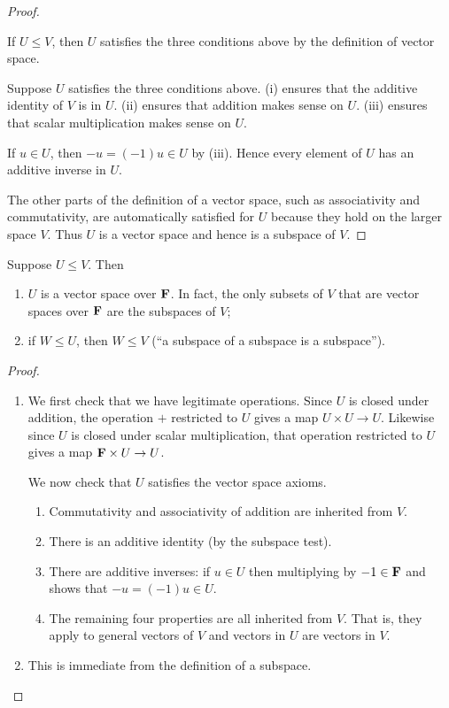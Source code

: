 \begin{proof} \

\fbox{$\implies$} If $U\le V$, then $U$ satisfies the three conditions above by the definition of vector space.

\fbox{$\impliedby$} Suppose $U$ satisfies the three conditions above. (i) ensures that the additive identity of $V$ is in $U$. (ii) ensures that addition makes sense on $U$. (iii) ensures that scalar multiplication makes sense on $U$.

If $u\in U$, then $-u=(-1)u\in U$ by (iii). Hence every element of $U$ has an additive inverse in $U$.

The other parts of the definition of a vector space, such as associativity and commutativity, are automatically satisfied for $U$ because they hold on the larger space $V$. Thus $U$ is a vector space and hence is a subspace of $V$.
\end{proof}

\begin{proposition}
Suppose $U\le V$. Then
\begin{enumerate}[label=(\roman*)]
\item $U$ is a vector space over $\mathbf F$. In fact, the only subsets of $V$ that are vector spaces over $\mathbf F$ are the subspaces of $V$;
\item if $W\le U$, then $W\le V$ (``a subspace of a subspace is a subspace'').
\end{enumerate}
\end{proposition}

\begin{proof} \
\begin{enumerate}[label=(\roman*)]
\item We first check that we have legitimate operations. Since $U$ is closed under addition, the operation $+$ restricted to $U$ gives a map $U\times U\to U$. Likewise since $U$ is closed under scalar multiplication, that operation restricted to $U$ gives a map $\mathbf F\times U\to U$.

We now check that $U$ satisfies the vector space axioms.
\begin{enumerate}[label=(\roman*)]
\item Commutativity and associativity of addition are inherited from $V$.
\item There is an additive identity (by the subspace test).
\item There are additive inverses: if $u\in U$ then multiplying by $-1\in\mathbf F$ and shows that $-u=(-1)u\in U$.
\item The remaining four properties are all inherited from $V$. That is, they apply to general vectors of $V$ and vectors in $U$ are vectors in $V$.
\end{enumerate}

\item This is immediate from the definition of a subspace.
\end{enumerate}
\end{proof}

